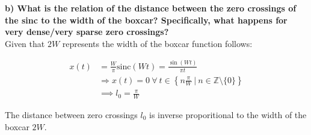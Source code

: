 \textbf{
	b) What is the relation of the distance between the zero crossings of the sinc to the width of the boxcar? 
	Specifically, what happens for very dense/very sparse zero crossings?
}
\\

Given that $2W$ represents the width of the boxcar function follows:

\begin{align*}
	x(t) &= \frac{W}{\pi} \text{sinc}(W t) = \frac{\sin(W t)}{\pi t}\\ 
	&\Rightarrow x(t) = 0\ \forall\ t \in \left\{n \frac{\pi}{W}\ |\ n \in \mathbb{Z} \setminus \{0\} \right\} \\
	&\implies l_0 = \frac{\pi}{W}
\end{align*}

The distance between zero crossings $l_0$ is inverse proporitional to the width of the boxcar $2W$.
